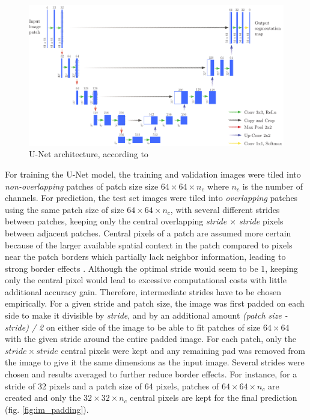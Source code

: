 \documentclass[10pt]{article}
\begin{document}
\begin{figure}[H]
    \centering
    \includegraphics[width=\textwidth]{unet}
    \caption{U-Net architecture, according to \textcite{ronneberger2015u}}
    \label{fig:u-net}
\end{figure}
For training the U-Net model, the training and validation images were tiled into \textit{non-overlapping} patches of patch size size $64 \times 64 \times n_c$ where $n_c$ is the number of channels. For prediction, the test set images were tiled into \textit{overlapping} patches using the same patch size of size $64 \times 64 \times n_c$, with several different strides between patches, keeping only the central overlapping \textit{stride $\times$ stride} pixels between adjacent patches. Central pixels of a patch are assumed more certain because of the larger available spatial context in the patch compared to pixels near the patch borders which partially lack neighbor information, leading to strong border effects \cite{Marmanis2016SemanticSO}. Although the optimal stride would seem to be 1, keeping only the central pixel would lead to excessive computational costs with little additional accuracy gain. Therefore, intermediate strides have to be chosen empirically. For a given stride and patch size, the image was first padded on each side to make it divisible by \textit{stride}, and by an additional amount \textit{(patch size - stride) / 2} on either side of the image to be able to fit patches of size $64 \times 64$ with the given stride around the entire padded image. For each patch, only the $stride \times stride$ central pixels were kept and any remaining pad was removed from the image to give it the same dimensions as the input image. Several strides were chosen and results averaged to further reduce border effects. For instance, for a stride of 32 pixels and a patch size of 64 pixels, patches of $64 \times 64 \times n_c$ are created and only the $32 \times 32 \times n_c$ central pixels are kept for the final prediction (fig. \ref{fig:im_padding}).
\end{document}
